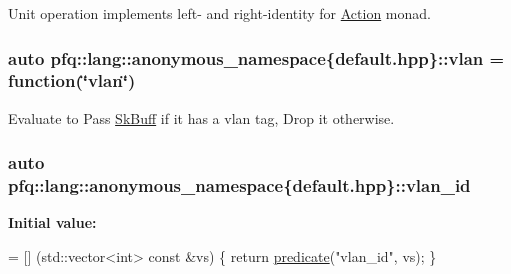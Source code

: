 Unit operation implements left-\/ and right-\/identity for \hyperlink{structpfq_1_1lang_1_1Action}{Action} monad. 

\subsubsection[{\texorpdfstring{vlan}{vlan}}]{\setlength{\rightskip}{0pt plus 5cm}auto pfq\+::lang\+::anonymous\+\_\+namespace\{default.\+hpp\}\+::vlan = {\bf function}(\char`\"{}vlan\char`\"{})}\hypertarget{namespacepfq_1_1lang_1_1anonymous__namespace_02default_8hpp_03_a747e907a678ad69c5bfdd3048a239b6a}{}\label{namespacepfq_1_1lang_1_1anonymous__namespace_02default_8hpp_03_a747e907a678ad69c5bfdd3048a239b6a}


Evaluate to {\ttfamily Pass} \hyperlink{structpfq_1_1lang_1_1SkBuff}{Sk\+Buff} if it has a vlan tag, {\ttfamily Drop} it otherwise. 

\subsubsection[{\texorpdfstring{vlan\+\_\+id}{vlan_id}}]{\setlength{\rightskip}{0pt plus 5cm}auto pfq\+::lang\+::anonymous\+\_\+namespace\{default.\+hpp\}\+::vlan\+\_\+id}\hypertarget{namespacepfq_1_1lang_1_1anonymous__namespace_02default_8hpp_03_ad2a631020f34bf10335ebb0e79f03920}{}\label{namespacepfq_1_1lang_1_1anonymous__namespace_02default_8hpp_03_ad2a631020f34bf10335ebb0e79f03920}
{\bfseries Initial value\+:}
\begin{DoxyCode}
= [] (std::vector<int> \textcolor{keyword}{const} &vs) \{
                                    \textcolor{keywordflow}{return} \hyperlink{namespacepfq_1_1lang_aca9adafc436b7f851621b979fa1aaf88}{predicate}(\textcolor{stringliteral}{"vlan\_id"}, vs);
                                \}
\end{DoxyCode}


